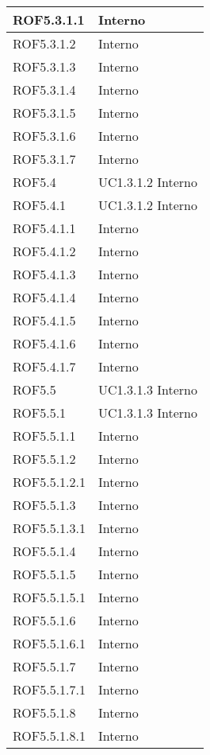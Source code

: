 \begin{center}
\begin{longtable}{| p{4cm} | p{4cm} |}
\hline
ROF5.3.1.1   &  Interno \\
\hline
ROF5.3.1.2   &  Interno \\
\hline
ROF5.3.1.3   &  Interno \\
\hline
ROF5.3.1.4   &  Interno \\
\hline
ROF5.3.1.5   &  Interno \\
\hline
ROF5.3.1.6   &  Interno \\
\hline
ROF5.3.1.7   &  Interno \\
\hline
ROF5.4   &  UC1.3.1.2 \newline Interno \\
\hline
ROF5.4.1   &  UC1.3.1.2 \newline Interno \\
\hline
ROF5.4.1.1   &  Interno \\
\hline
ROF5.4.1.2   &  Interno \\
\hline
ROF5.4.1.3   &  Interno \\
\hline
ROF5.4.1.4   &  Interno \\
\hline
ROF5.4.1.5   &  Interno \\
\hline
ROF5.4.1.6   &  Interno \\
\hline
ROF5.4.1.7   &  Interno \\
\hline
ROF5.5   &  UC1.3.1.3 \newline Interno \\
\hline
ROF5.5.1   &  UC1.3.1.3 \newline Interno \\
\hline
ROF5.5.1.1   &  Interno \\
\hline
ROF5.5.1.2   &  Interno \\
\hline
ROF5.5.1.2.1   &  Interno \\
\hline
ROF5.5.1.3   &  Interno \\
\hline
ROF5.5.1.3.1   &  Interno \\
\hline
ROF5.5.1.4   &  Interno \\
\hline
ROF5.5.1.5   &  Interno \\
\hline
ROF5.5.1.5.1   &  Interno \\
\hline
ROF5.5.1.6   &  Interno \\
\hline
ROF5.5.1.6.1   &  Interno \\
\hline
ROF5.5.1.7   &  Interno \\
\hline
ROF5.5.1.7.1   &  Interno \\
\hline
ROF5.5.1.8   &  Interno \\
\hline
ROF5.5.1.8.1   &  Interno \\

\end{longtable}
\end{center}
